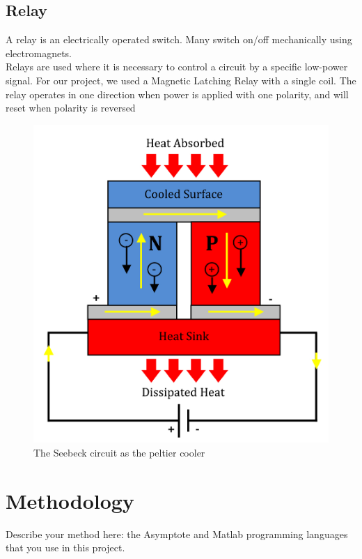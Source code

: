 \documentclass[12pt,a4paper]{report}
\begin{document}
\section{Relay}
A relay is an electrically operated switch. Many switch on/off
mechanically using electromagnets.\\
Relays are used where it is necessary to control a circuit by a specific
low-power signal. For our project, we used a Magnetic Latching Relay
with a single coil. The relay operates in one direction when power is
applied with one polarity, and will reset when polarity is reversed
\begin{figure}[!h]
	\centering
	\includegraphics[scale=1.4]{peltier_effect}
	\caption{The Seebeck circuit as the peltier cooler}
\end{figure}



\chapter{Methodology} 
Describe your method here: the Asymptote and Matlab programming languages that you use in this project.
\end{document}
